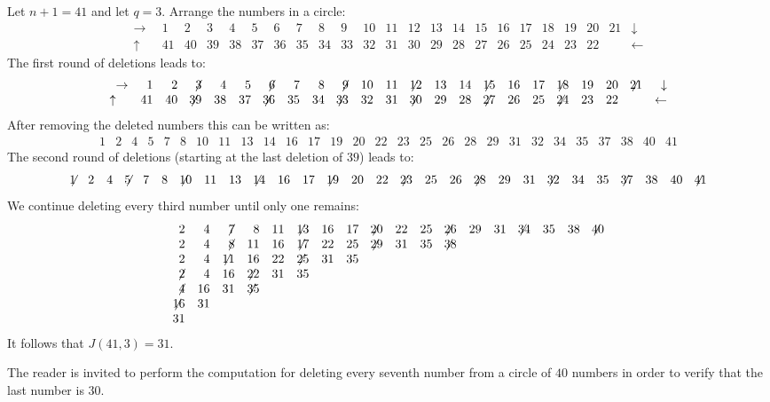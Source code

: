 \begin{example}
Let $n+1=41$ and let $q=3$. Arrange the numbers in a circle:
\[
\begin{array}{rrrrrrrrrrrrrrrrrrrrrrr}
\rightarrow&1&2&3&4&5&6&7&8&9&10&
           11&12&13&14&15&16&17&18&19&20&21&
\downarrow\\
\uparrow\quad&41&40&39&38&37&36&35&34&33&
32&31&30&29&28&27&26&25&24&23&22&
&\leftarrow
\end{array}
\]
The first round of deletions leads to:
\[
\begin{array}{rrrrrrrrrrrrrrrrrrrrrrr}
\rightarrow&1&2&\not\! 3&4&5&\not\! 6&7&8&\not\! 9&10&
           11&\not\!\! 12&13&14&\not\!\! 15&16&17&\not\!\! 18&19&20&\not\!\! 21&
\downarrow\\
	\uparrow\quad&41&40&\not\!\! 39&38&37&\not\!\! 36&35&34&\not\!\! 33&
32&31&\not\!\! 30&29&28&\not\!\! 27&26&25&\not\!\! 24&23&22&
&\leftarrow
\end{array}
\]
After removing the deleted numbers this can be written as:
\[
\begin{array}{rrrrrrrrrrrrrrrrrrrrrrrrrrrr}
1&2&4&5&7&8&10&11&13&14&16&17&19&20&
22&23&25&26&28&29&31&32&34&35&37&38&40&41
\end{array}
\]
The second round of deletions (starting at the last deletion of $39$) leads to:
\[
\begin{array}{rrrrrrrrrrrrrrrrrrrrrrrrrrrr}
\not\!\! 1&2&4&\not\!\! 5&7&8&\not\!\! 10&11&13&\not\!\! 14&16&17&\not\!\! 19&20&
22&\not\!\! 23&25&26&\not\!\! 28&29&31&\not\!\! 32&34&35&\not\!\! 37&38&40&\not\!\! 41
\end{array}
\]
We continue deleting every third number until only one remains:
\[
\begin{array}{rrrrrrrrrrrrrrrrrr}
2&4&\not\!7&8&11&\not\!\!13&16&17&\not\!\!20&22&25&\not\!\!26&29&31&\not\!\!34&35&38&\not\!\!40
\\
2&4&\not\!8&11&16&\not\!\!17&22&25&\not\!\!29&31&35&\not\!\!38
\\
2&4&\not\!\!11&16&22&\not\!\!25&31&35
\\
\not\!2&4&16&\not\!\!22&31&35
\\
\not\!4&16&31&\not\!\!35
\\
\not\!\!16&31
\\
31
\end{array}
\]
It follows that $J(41,3)=31$.
\end{example}

The reader is invited to perform the computation for deleting every seventh number from a circle of $40$ numbers in order to  verify that the last number is $30$.

